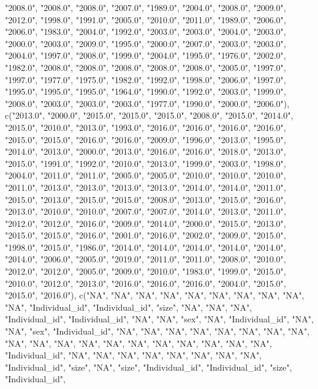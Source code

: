 \documentclass{article}\usepackage[]{graphicx}\usepackage[]{color}
\begin{document}
"2008.0", "2008.0", "2008.0", "2007.0", "1989.0", "2004.0", "2008.0", "2009.0", "2012.0", "1998.0", "1991.0", "2005.0", "2010.0", "2011.0", "1989.0", "2006.0", "2006.0", "1983.0", "2004.0", "1992.0", "2003.0", "2003.0", "2004.0", "2003.0", "2000.0", "2003.0", "2009.0", "1995.0", "2000.0", "2007.0", "2003.0", "2003.0", "2004.0", "1997.0", "2008.0", "1999.0", "2004.0", "1995.0", "1976.0", "2002.0", "1982.0", "2008.0", "2008.0", "2008.0", "2008.0", "2008.0", "2005.0", "1997.0", "1997.0", "1977.0", "1975.0", 
"1982.0", "1992.0", "1998.0", "2006.0", "1997.0", "1995.0", "1995.0", "1995.0", "1964.0", "1990.0", "1992.0", "2003.0", "1999.0", "2008.0", "2003.0", "2003.0", "2003.0", "1977.0", "1990.0", "2000.0", "2006.0"), c("2013.0", "2000.0", "2015.0", "2015.0", "2015.0", "2008.0", "2015.0", "2014.0", "2015.0", "2010.0", "2013.0", "1993.0", "2016.0", "2016.0", "2016.0", "2016.0", "2015.0", "2015.0", "2016.0", "2016.0", "2009.0", "1996.0", "2013.0", "1995.0", "2014.0", "2013.0", "2000.0", "2013.0", "2016.0", "2016.0", "2018.0", "2013.0", "2015.0", "1991.0", "1992.0", "2010.0", "2013.0", "1999.0", "2003.0", "1998.0", "2004.0", "2011.0", "2011.0", "2005.0", "2005.0", "2010.0", "2010.0", "2010.0", "2011.0", "2013.0", 
"2013.0", "2013.0", "2013.0", "2014.0", "2014.0", "2011.0", "2015.0", "2013.0", "2015.0", "2015.0", "2008.0", "2013.0", "2015.0", "2016.0", "2013.0", "2010.0", "2010.0", "2007.0", "2007.0", "2014.0", "2013.0", "2011.0", "2012.0", "2012.0", "2016.0", "2009.0", "2014.0", "2000.0", "2015.0", "2013.0", "2015.0", "2015.0", "2016.0", "2001.0", "2016.0", "2002.0", "2009.0", "2015.0", "1998.0", "2015.0", "1986.0", "2014.0", "2014.0", "2014.0", "2014.0", "2014.0", "2014.0", "2006.0", "2005.0", "2019.0", "2011.0", 
"2011.0", "2008.0", "2010.0", "2012.0", "2012.0", "2005.0", "2009.0", "2010.0", "1983.0", "1999.0", "2015.0", "2010.0", "2012.0", "2013.0", "2016.0", "2016.0", "2016.0", "2004.0", "2015.0", "2015.0", "2016.0"), c("NA", "NA", "NA", "NA", "NA", "NA", "NA", "NA", "NA", "NA", "Individual_id", "Individual_id", "size", "NA", "NA", "NA", "Individual_id", "Individual_id", "NA", "NA", "sex", "NA", "Individual_id", "NA", "NA", "sex", "Individual_id", "NA", "NA", "NA", "NA", "NA", "NA", "NA", "NA", "NA", "NA", "NA", "NA", "NA", "NA", "NA", "NA", "NA", "NA", "NA", "Individual_id", "NA", "NA", "NA", "NA", "NA", "NA", "NA", "NA", "Individual_id", "size", "NA", "size", "Individual_id", "Individual_id", "size", "Individual_id", 
\end{document}
